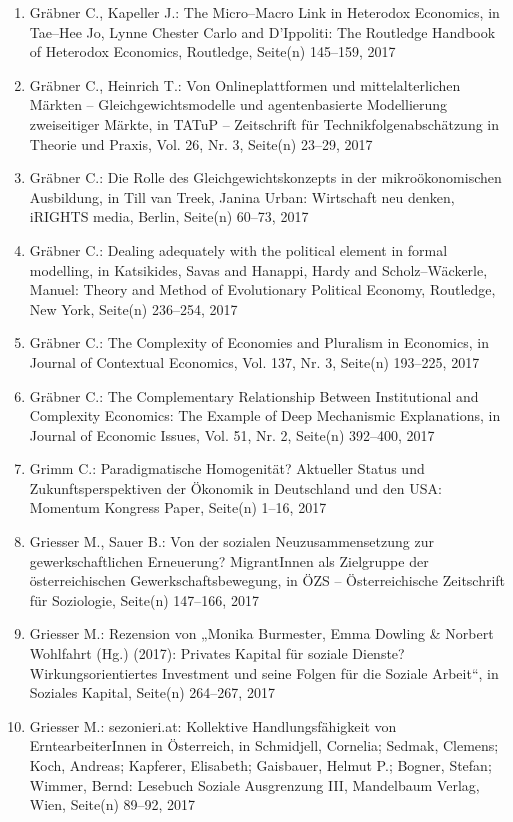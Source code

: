 \begin{enumerate}
	 \item Gräbner C., Kapeller J.: The Micro--Macro Link in Heterodox Economics, in Tae--Hee Jo, Lynne Chester Carlo and D'Ippoliti: The Routledge Handbook of Heterodox Economics, Routledge, Seite(n) 145--159, 2017
	 \item Gräbner C., Heinrich T.: Von Onlineplattformen und mittelalterlichen Märkten -- Gleichgewichtsmodelle und agentenbasierte Modellierung zweiseitiger Märkte, in TATuP -- Zeitschrift für Technikfolgenabschätzung in Theorie und Praxis, Vol. 26, Nr. 3, Seite(n) 23--29, 2017
	 \item Gräbner C.: Die Rolle des Gleichgewichtskonzepts in der mikroökonomischen Ausbildung, in Till van Treek, Janina Urban: Wirtschaft neu denken, iRIGHTS media, Berlin, Seite(n) 60--73, 2017
	 \item Gräbner C.: Dealing adequately with the political element in formal modelling, in Katsikides, Savas and Hanappi, Hardy and Scholz--Wäckerle, Manuel: Theory and Method of Evolutionary Political Economy, Routledge, New York, Seite(n) 236--254, 2017
	 \item Gräbner C.: The Complexity of Economies and Pluralism in Economics, in Journal of Contextual Economics, Vol. 137, Nr. 3, Seite(n) 193--225, 2017
	 \item Gräbner C.: The Complementary Relationship Between Institutional and Complexity Economics: The Example of Deep Mechanismic Explanations, in Journal of Economic Issues, Vol. 51, Nr. 2, Seite(n) 392--400, 2017
	 \item Grimm C.: Paradigmatische Homogenität? Aktueller Status und Zukunftsperspektiven der Ökonomik in Deutschland und den USA: Momentum Kongress Paper, Seite(n) 1--16, 2017
	 \item Griesser M., Sauer B.: Von der sozialen Neuzusammensetzung zur gewerkschaftlichen Erneuerung? MigrantInnen als Zielgruppe der österreichischen Gewerkschaftsbewegung, in ÖZS -- Österreichische Zeitschrift für Soziologie, Seite(n) 147--166, 2017
	 \item Griesser M.: Rezension von „Monika Burmester, Emma Dowling \& Norbert Wohlfahrt (Hg.) (2017): Privates Kapital für soziale Dienste? Wirkungsorientiertes Investment und seine Folgen für die Soziale Arbeit“, in Soziales Kapital, Seite(n) 264--267, 2017
	 \item Griesser M.: sezonieri.at: Kollektive Handlungsfähigkeit von ErntearbeiterInnen in Österreich, in Schmidjell, Cornelia; Sedmak, Clemens; Koch, Andreas; Kapferer, Elisabeth; Gaisbauer, Helmut P.; Bogner, Stefan; Wimmer, Bernd: Lesebuch Soziale Ausgrenzung III, Mandelbaum Verlag, Wien, Seite(n) 89--92, 2017

\end{enumerate}
